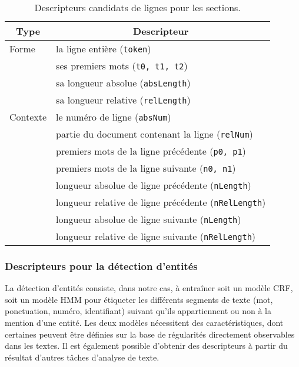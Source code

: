\begin{table}[!htb]
	\centering
	\begin{tabular}{|l|l|}
		 \hline
		\multicolumn{1}{|c}{Type} & \multicolumn{1}{|c|}{Descripteur} \\ \hline
		Forme & \tabitem la ligne entière (\verb|token|)  \\  
		& \tabitem ses premiers mots (\verb|t0, t1, t2|) \\
		& \tabitem sa longueur absolue (\verb|absLength|) \\ 
		& \tabitem sa longueur relative (\verb|relLength|) \\ \hline
		Contexte & \tabitem le numéro de ligne (\verb|absNum|) \\
				  & \tabitem partie du document contenant la ligne (\verb|relNum|) \\
				  & \tabitem premiers mots de la ligne précédente (\verb|p0, p1|) \\ 
				   & \tabitem premiers mots de la ligne suivante (\verb|n0, n1|) \\
				   & \tabitem longueur absolue de ligne précédente (\verb|nLength|) \\  
				   & \tabitem longueur relative de ligne précédente (\verb|nRelLength|) \\
				    & \tabitem longueur absolue de ligne suivante (\verb|nLength|) \\  
				    & \tabitem longueur relative de ligne suivante (\verb|nRelLength|) \\ \hline
	\end{tabular}
\caption{Descripteurs candidats de lignes pour les sections.} \label{tab:structuration:descripteursligne}
\end{table}

\subsubsection{Descripteurs pour la détection d'entités}

La détection d'entités consiste, dans notre cas, à entraîner soit un modèle CRF, soit un modèle HMM pour étiqueter les différents segments de texte (mot, ponctuation, numéro, identifiant) suivant qu'ils appartiennent ou non à la mention d'une entité. Les deux modèles nécessitent des caractéristiques, dont certaines peuvent être définies sur la base de régularités directement observables dans les textes. Il est également possible d'obtenir des descripteurs à partir du résultat d'autres tâches d'analyse de texte.

